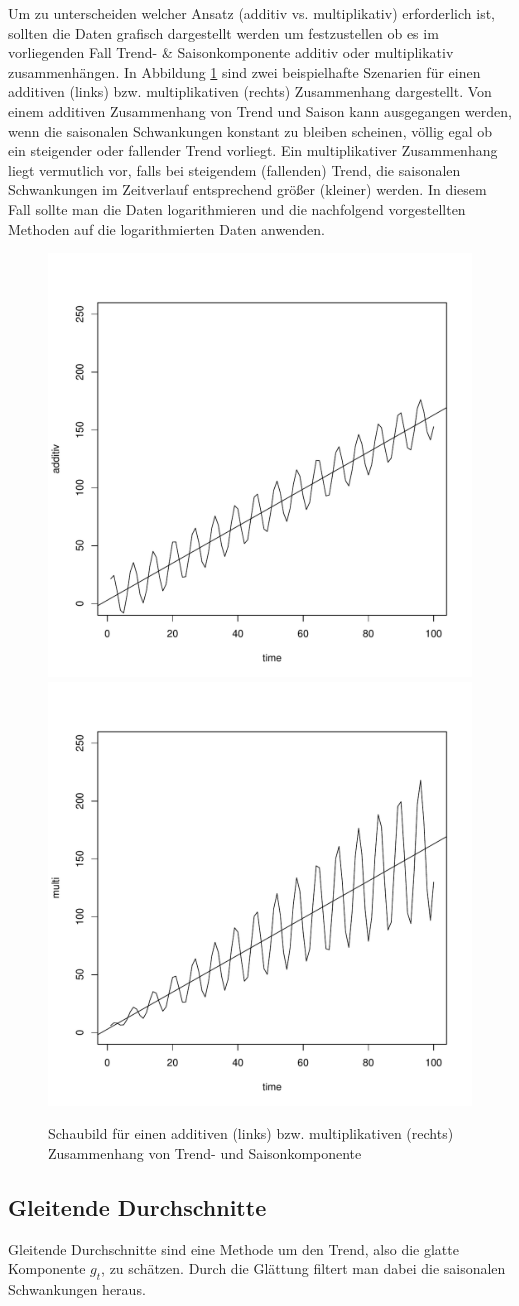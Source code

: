 \documentclass[a4paper]{article}
\begin{document}
\noindent Um zu unterscheiden welcher Ansatz (additiv vs. multiplikativ) erforderlich ist, sollten die Daten grafisch dargestellt werden um festzustellen ob es im vorliegenden Fall Trend- \& Saisonkomponente additiv oder multiplikativ zusammenhängen. In Abbildung \ref{fig:add_mult} sind zwei beispielhafte Szenarien für einen additiven (links) bzw. multiplikativen (rechts) Zusammenhang dargestellt. Von einem additiven Zusammenhang von Trend und Saison kann ausgegangen werden, wenn die saisonalen Schwankungen konstant zu bleiben scheinen, völlig egal ob ein steigender oder fallender Trend vorliegt. Ein multiplikativer Zusammenhang liegt vermutlich vor, falls bei steigendem (fallenden) Trend, die saisonalen Schwankungen im Zeitverlauf entsprechend größer (kleiner) werden. In diesem Fall sollte man die Daten logarithmieren und die nachfolgend vorgestellten Methoden auf die logarithmierten Daten anwenden. 

\begin{figure}
    \centering
        \includegraphics[width = .45\textwidth]{figures/additiv.pdf}
        \includegraphics[width = .45\textwidth]{figures/multiplikativ.pdf}
    \caption{Schaubild für einen additiven (links) bzw. multiplikativen (rechts) Zusammenhang von Trend- und Saisonkomponente}
    \label{fig:add_mult}
\end{figure}

\subsection{Gleitende Durchschnitte}
Gleitende Durchschnitte sind eine Methode um den Trend, also die glatte Komponente $g_t$, zu schätzen. Durch die Glättung filtert man dabei die saisonalen Schwankungen heraus.
\end{document}
